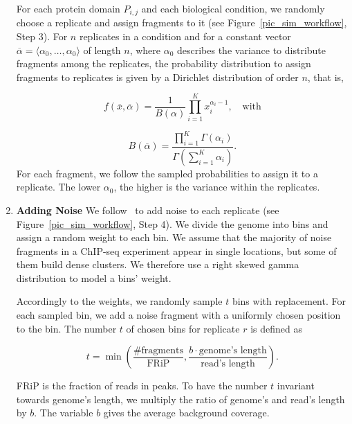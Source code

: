 \begin{enumerate}[label=\hspace{4cm} \arabic*. Step, leftmargin=1.35cm]
For each protein domain $P_{i,j}$ and each biological condition, we randomly choose a replicate and assign fragments to it (see Figure~\ref{pic_sim_workflow}, Step 3).
For $n$ replicates in a condition and for a constant vector $\overline{\alpha} = \langle \alpha_0, \ldots, \alpha_0 \rangle$ of length $n$, where $\alpha_0$ describes the variance to distribute fragments among the replicates, the probability distribution to assign fragments to replicates is given by a Dirichlet distribution of order $n$, that is,

$$
f(\overline{x}, \overline{\alpha}) = \frac{1}{B(\alpha)} \prod_{i=1}^K x_i^{\alpha_i-1}, \quad \text{with}
$$

$$B(\overline{\alpha}) = \frac{\prod_{i=1}^K \Gamma (\alpha_i)}{\Gamma\left( \sum_{i=1}^K \alpha_i\right)}.$$
\noindent 
For each fragment, we follow the sampled probabilities to assign it to a replicate.
The lower $\alpha_0$, the higher is the variance within the replicates.


 \item \textbf{Adding Noise}
We follow~\cite{zhang2008} to add noise to each replicate (see Figure~\ref{pic_sim_workflow}, Step 4).
We divide the genome into bins and assign a random weight to each bin.
We assume that the majority of noise fragments in a ChIP-seq experiment appear in single locations, but some of them build dense clusters.
We therefore use a right skewed gamma distribution to model a bins' weight.

Accordingly to the weights, we randomly sample $t$ bins with replacement.
For each sampled bin, we add a noise fragment with a uniformly chosen position to the bin.
The number $t$ of chosen bins for replicate $r$ is defined as

$$t = \min\left(\frac{\#\text{fragments}}{\text{FRiP}}, \frac{b \cdot \text{genome's length}}{\text{read's length}}\right).$$

\noindent
FRiP is the fraction of reads in peaks.
To have the number $t$ invariant towards genome's length, we multiply the ratio of genome's and read's length by $b$.
The variable $b$ gives the average background coverage.


\end{enumerate}
